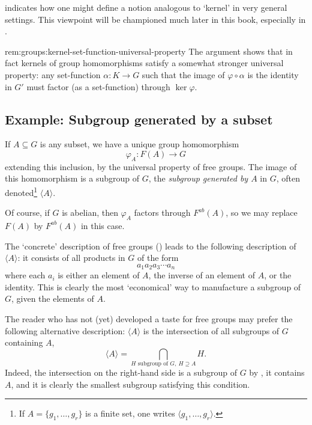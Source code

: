  indicates how
one might define a notion analogous to `kernel' in very general
settings. This viewpoint will be championed much later in this book,
especially in .

\begin{rem}{}{rem:groups:kernel-set-function-universal-property}
  The argument shows that in fact kernels of group homomorphisms
  satisfy a somewhat stronger universal property: any set-function
  $\alpha : K \to G$ such that the image of $\varphi \circ \alpha$ is
  the identity in $G'$ must factor (as a set-function) through
  $\ker\varphi$.
\end{rem}

\subsection{Example: Subgroup generated by a subset}
\label{subsec:groups:example-subgroup-generated-by-a-subset}
If $A \subseteq G$ is any subset, we have a unique group homomorphism
\[
  \varphi_A : F(A) \to G
\]
extending this inclusion, by the universal property of free
groups. The image of this homomorphism is a subgroup of $G$, the
\emph{subgroup generated by $A$} in $G$, often denoted\footnote{If
  $A = \{g_1, \dots, g_r\}$ is a finite set, one writes
  $\langle g_1, \dots, g_r \rangle$.} $\langle A \rangle$.

Of course, if $G$ is abelian, then $\varphi_A$ factors through
$F^{ab}(A)$, so we may replace $F(A)$ by $F^{ab}(A)$ in this case.

The `concrete' description of free groups
() leads to the following
description of $\langle A \rangle$: it consists of all products in $G$
of the form
\[
  a_1 a_2 a_3 \cdots a_n
\]
where each $a_i$ is either an element of $A$, the inverse of an
element of $A$, or the identity. This is clearly the most `economical'
way to manufacture a subgroup of $G$, given the elements of $A$.

The reader who has not (yet) developed a taste for free groups may
prefer the following alternative description: $\langle A \rangle$ is
the intersection of all subgroups of $G$ containing $A$,
\[
  \langle A \rangle = \bigcap_{H \text{ subgroup of } G,\ H \supseteq
    A} H.
\]
Indeed, the intersection on the right-hand side is a subgroup of $G$
by , it contains $A$,
and it is clearly the smallest subgroup satisfying this condition.

